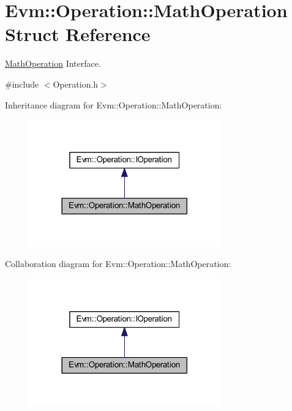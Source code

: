 \hypertarget{struct_evm_1_1_operation_1_1_math_operation}{}\section{Evm\+:\+:Operation\+:\+:Math\+Operation Struct Reference}
\label{struct_evm_1_1_operation_1_1_math_operation}


\mbox{\hyperlink{struct_evm_1_1_operation_1_1_math_operation}{Math\+Operation}} Interface.  




{\ttfamily \#include $<$Operation.\+h$>$}



Inheritance diagram for Evm\+:\+:Operation\+:\+:Math\+Operation\+:
\nopagebreak
\begin{figure}[H]
\begin{center}
\leavevmode
\includegraphics[width=233pt]{struct_evm_1_1_operation_1_1_math_operation__inherit__graph}
\end{center}
\end{figure}


Collaboration diagram for Evm\+:\+:Operation\+:\+:Math\+Operation\+:
\nopagebreak
\begin{figure}[H]
\begin{center}
\leavevmode
\includegraphics[width=233pt]{struct_evm_1_1_operation_1_1_math_operation__coll__graph}
\end{center}
\end{figure}
